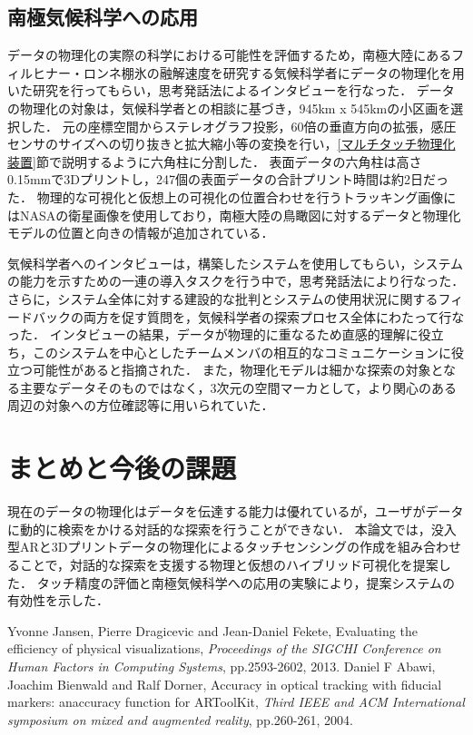 \documentclass[a4paper,10pt,twocolumn,uplatex]{jsarticle}
\begin{document}
\subsection{南極気候科学への応用}
データの物理化の実際の科学における可能性を評価するため，南極大陸にあるフィルヒナー・ロンネ棚氷の融解速度を研究する気候科学者にデータの物理化を用いた研究を行ってもらい，思考発話法によるインタビューを行なった．
データの物理化の対象は，気候科学者との相談に基づき，945km x 545kmの小区画を選択した．
元の座標空間からステレオグラフ投影，60倍の垂直方向の拡張，感圧センサのサイズへの切り抜きと拡大縮小等の変換を行い，\ref{マルチタッチ物理化装置}節で説明するように六角柱に分割した．
表面データの六角柱は高さ0.15mmで3Dプリントし，247個の表面データの合計プリント時間は約2日だった．
物理的な可視化と仮想上の可視化の位置合わせを行うトラッキング画像にはNASAの衛星画像を使用しており，南極大陸の鳥瞰図に対するデータと物理化モデルの位置と向きの情報が追加されている．\par
気候科学者へのインタビューは，構築したシステムを使用してもらい，システムの能力を示すための一連の導入タスクを行う中で，思考発話法により行なった．
さらに，システム全体に対する建設的な批判とシステムの使用状況に関するフィードバックの両方を促す質問を，気候科学者の探索プロセス全体にわたって行なった．
インタビューの結果，データが物理的に重なるため直感的理解に役立ち，このシステムを中心としたチームメンバの相互的なコミュニケーションに役立つ可能性があると指摘された．
また，物理化モデルは細かな探索の対象となる主要なデータそのものではなく，3次元の空間マーカとして，より関心のある周辺の対象への方位確認等に用いられていた．

\section{まとめと今後の課題}
現在のデータの物理化はデータを伝達する能力は優れているが，ユーザがデータに動的に検索をかける対話的な探索を行うことができない．
本論文では，没入型ARと3Dプリントデータの物理化によるタッチセンシングの作成を組み合わせることで，対話的な探索を支援する物理と仮想のハイブリッド可視化を提案した．
タッチ精度の評価と南極気候科学への応用の実験により，提案システムの有効性を示した．

\footnotesize{
  \begin{thebibliography}{99}
     Yvonne Jansen, Pierre Dragicevic and Jean-Daniel Fekete, Evaluating the efficiency of physical visualizations, \textit{Proceedings of the SIGCHI Conference on Human Factors in Computing Systems}, pp.2593-2602, 2013.
     Daniel F Abawi, Joachim Bienwald and Ralf Dorner, Accuracy in optical tracking with fiducial markers: anaccuracy function for ARToolKit, \textit{Third IEEE and ACM International symposium on mixed and augmented reality}, pp.260-261, 2004.
  \end{thebibliography}
}

% 
% 

\end{document}
